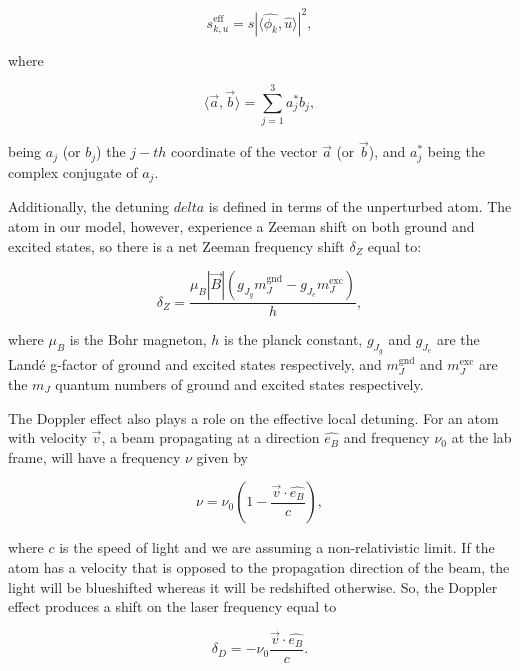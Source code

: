 \documentclass[12pt,a4paper,twoside]{article}
\begin{document}
\begin{equation}
	s_{k,u}^{\mathrm{eff}} = s\left|\langle \hat{\phi_k},\hat{u} \rangle\right| ^2,
\end{equation}

\noindent
where 

\begin{equation*}
	\langle \vec{a},\vec{b} \rangle = \sum_{j=1}^{3} a_j^* b_j,
\end{equation*}

\noindent
being $a_j$ (or $b_j$) the $j-th$ coordinate of the vector $\vec{a}$ (or $\vec{b}$), and $a_j^*$ being the complex conjugate of $a_j$.

Additionally, the detuning $delta$ is defined in terms of the unperturbed atom. The atom in our model, however, experience a Zeeman shift on both ground and excited states, so there is a net Zeeman frequency shift $\delta_Z$ equal to:

\begin{equation}
	\delta_Z = \dfrac{\mu_B \left|\vec{B}\right| (g_{J_g} m_J^{\mathrm{gnd}} - g_{J_e} m_J^{\mathrm{exc}})}{h},
\end{equation}

\noindent
where $\mu_B$ is the Bohr magneton, $h$ is the planck constant, $g_{J_g}$ and $g_{J_e}$ are the Landé g-factor of ground and excited states respectively, and $m_J^{\mathrm{gnd}}$ and $m_J^{\mathrm{exc}}$ are the $m_J$ quantum numbers of ground and excited states respectively.

The Doppler effect also plays a role on the effective local detuning. For an atom with velocity $\vec{v}$, a beam propagating at a direction $\hat{e_B}$ and frequency $\nu_0$ at the lab frame, will have a frequency $\nu$ given by

\begin{equation}
	\nu = \nu_0\left( 1 - \dfrac{\vec{v}\cdot{\hat{e_B}}}{c} \right),
\end{equation}

\noindent
where $c$ is the speed of light and we are assuming a non-relativistic limit. If the atom has a velocity that is opposed to the propagation direction of the beam, the light will be blueshifted whereas it will be redshifted otherwise. So, the Doppler effect produces a shift on the laser frequency equal to

\begin{equation}
	\delta_D = - \nu_0\dfrac{\vec{v}\cdot{\hat{e_B}}}{c}.
\end{equation}
\end{document}
